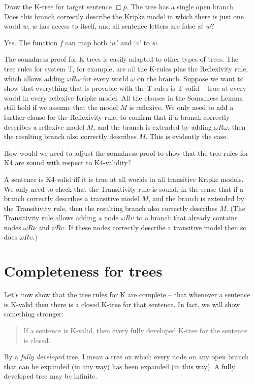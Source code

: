 \begin{exercise}
  Draw the K-tree for target sentence $\Box p$. The tree has a single open
  branch. Does this branch correctly describe the Kripke model in which there is
  just one world $w$, $w$ has access to itself, and all sentence letters are
  false at $w$?
\end{exercise}
\begin{solution}
  Yes. The function $f$ can map both `$w$' and `$v$' to $w$.
\end{solution}

The soundness proof for K-trees is easily adapted to other types of trees. The
tree rules for system T, for example, are all the K-rules plus the Reflexivity
rule, which allows adding $\omega R \omega$ for every world $\omega$ on the
branch. Suppose we want to show that everything that is provable with the
T-rules is T-valid -- true at every world in every reflexive Kripke model. All
the clauses in the Soundness Lemma still hold if we assume that the model $M$ is
reflexive. We only need to add a further clause for the Reflexivity rule, to
confirm that if a branch correctly describes a reflexive model $M$, and the
branch is extended by adding $\omega R \omega$, then the resulting branch also
correctly describes $M$. This is evidently the case.

\begin{exercise}
  How would we need to adjust the soundness proof to show that the tree rules
  for K4 are sound with respect to K4-validity?
\end{exercise}
\begin{solution}
  A sentence is K4-valid iff it is true at all worlds in all transitive Kripke
  models. We only need to check that the Transitivity rule is sound, in the
  sense that if a branch correctly describes a transitive model $M$, and the
  branch is extended by the Transitivity rule, then the resulting branch also
  correctly describes $M$. (The Transitivity rule allows adding a node
  $\omega R \upsilon$ to a branch that already contains nodes $\omega R \nu$ and
  $\nu R \upsilon$. If these nodes correctly describe a transitive model then so does $\omega R \upsilon$.)
\end{solution}

\section{Completeness for trees}%
\label{sec:completenesstrees}

Let's now show that the tree rules for K are complete -- that whenever a sentence is
K-valid then there is a closed K-tree for that sentence. In fact, we will show
something stronger:
\begin{quote}
  If a sentence is K-valid, then every fully developed K-tree for the sentence is closed.
\end{quote}
By a \emph{fully developed} tree, I mean a tree on which every node on any open
branch that can be expanded (in any way) has been expanded (in this way). A
fully developed tree may be infinite.

